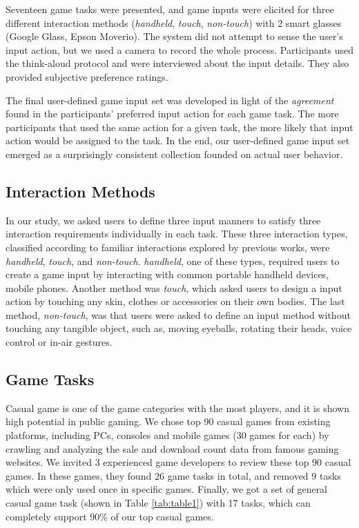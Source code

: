 \documentclass{sigchi}
\begin{document}
    Seventeen game tasks were presented, and game inputs were elicited for three different interaction methods (\emph{handheld}, \emph{touch}, \emph{non-touch}) with 2 smart glasses (Google Glass, Epson Moverio). The system did not attempt to sense the user's input action, but we used a camera to record the whole process. Participants used the think-aloud protocol and were interviewed about the input details. They also provided subjective preference ratings.

    The final user-defined game input set was developed in light of the \textsl{agreement} found in the participants' preferred input action for each game task. The more participants that used the same action for a given task, the more likely that input action would be assigned to the task. In the end, our user-defined game input set emerged as a surprisingly consistent collection founded on actual user behavior.

    \subsection {Interaction Methods}
    In our study, we asked users to define three input manners to satisfy three interaction requirements individually in each task. These three interaction types, classified according to familiar interactions explored by previous works, were \textsl{handheld}, \textsl{touch}, and \textsl{non-touch}. \textsl{handheld}, one of these types, required users to create a game input by interacting with common portable handheld devices, mobile phones. Another method was \textsl{touch}, which asked users to design a input action by touching any skin, clothes or accessories on their own bodies. The last method, \textsl{non-touch}, was that users were asked to define an input method without touching any tangible object, such as, moving eyeballs, rotating their heads, voice control or in-air gestures. 

    \subsection {Game Tasks}
    Casual game is one of the game categories with the most players\cite{esa_ef_2014}, and it is shown high potential in public gaming\cite{Jurgelionis:2011:PET:2027456.2027462,Reis:2012:EMC:2405577.2405651,Biskupski:2014:DEB:2559206.2580097}. We chose top 90 casual games\cite{TopGames} from existing platforms, including PCs, consoles and mobile games (30 games for each) by crawling and analyzing the sale and download count data from famous gaming websites\cite{appannie,VGChartz,Steam,GameStop}. We invited 3 experienced game developers to review these top 90 casual games. In these games, they found 26 game tasks in total, and removed 9 tasks which were only used once in specific games. Finally, we got a set of general casual game task (shown in Table \ref{tab:table1}) with 17 tasks, which can completely support 90\% of our top casual games. 
\end{document}
